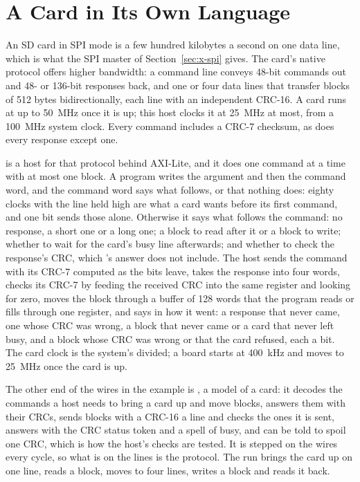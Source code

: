 \section{A Card in Its Own Language}
\label{sec:x-sd}

An SD card in SPI mode is a few hundred kilobytes a second on one
data line, which is what the SPI master of Section~\ref{sec:x-spi}
gives. The card's native protocol offers higher bandwidth: a command
line conveys 48-bit commands out and 48- or 136-bit responses back, and
one or four data lines that transfer blocks of 512 bytes bidirectionally,
each line with an independent CRC-16. A card runs at up to 50~MHz once it
is up; this host clocks it at 25~MHz at most, from a 100~MHz system clock.
Every command includes a CRC-7 checksum, as does every response except one.

 is a host for that protocol behind AXI-Lite, and it does one
command at a time with at most one block. A program writes the
argument and then the command word, and the command word says what
follows, or that nothing does: eighty clocks with the line held high
are what a card wants before its first command, and one bit sends
those alone. Otherwise it says what follows the command: no response, a short one or a long one; a block to read
after it or a block to write; whether to wait for the card's busy
line afterwards; and whether to check the response's CRC, which
's answer does not include. The host sends the command
with its CRC-7 computed as the bits leave, takes the response into
four words, checks its CRC-7 by feeding the received CRC into the
same register and looking for zero, moves the block through a buffer
of 128 words that the program reads or fills through one register,
and says in  how it went: a response that never came,
one whose CRC was wrong, a block that never came or a card that never
left busy, and a block whose CRC was wrong or that the card refused,
each a bit. The card clock is the system's divided; a board starts at
400~kHz and moves to 25~MHz once the card is up.

The other end of the wires in the example is , a model of
a card: it decodes the commands a host needs to bring a card up and
move blocks, answers them with their CRCs, sends blocks with a CRC-16
a line and checks the ones it is sent, answers with the CRC status
token and a spell of busy, and can be told to spoil one CRC, which is
how the host's checks are tested. It is stepped on the wires every
cycle, so what is on the lines is the protocol. The run brings the
card up on one line, reads a block, moves to four lines, writes a
block and reads it back.

